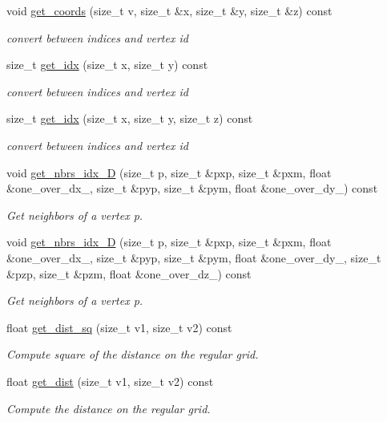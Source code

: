 \begin{DoxyCompactItemize}
void \hyperlink{struct_r_grid_a22875fbd6ba3068ec8ccd48b355e2183}{get\+\_\+coords} (size\+\_\+t v, size\+\_\+t \&x, size\+\_\+t \&y, size\+\_\+t \&z) const 
\begin{DoxyCompactList}\small\item\em convert between indices and vertex id \end{DoxyCompactList}\item 
size\+\_\+t \hyperlink{struct_r_grid_a906a0794df53258fd129707f5adb1a09}{get\+\_\+idx} (size\+\_\+t x, size\+\_\+t y) const 
\begin{DoxyCompactList}\small\item\em convert between indices and vertex id \end{DoxyCompactList}\item 
size\+\_\+t \hyperlink{struct_r_grid_a8ca551941c83ba37e549260a2f4d3a86}{get\+\_\+idx} (size\+\_\+t x, size\+\_\+t y, size\+\_\+t z) const 
\begin{DoxyCompactList}\small\item\em convert between indices and vertex id \end{DoxyCompactList}\item 
void \hyperlink{struct_r_grid_aaeedcdbb340eaf106a4792dec3a54d7d}{get\+\_\+nbrs\+\_\+idx\+\_\+D} (size\+\_\+t p, size\+\_\+t \&pxp, size\+\_\+t \&pxm, float \&one\+\_\+over\+\_\+dx\+\_\+, size\+\_\+t \&pyp, size\+\_\+t \&pym, float \&one\+\_\+over\+\_\+dy\+\_\+) const 
\begin{DoxyCompactList}\small\item\em Get neighbors of a vertex p. \end{DoxyCompactList}\item 
void \hyperlink{struct_r_grid_add4468ed71d4f02e7702bd90d9255f15}{get\+\_\+nbrs\+\_\+idx\+\_\+D} (size\+\_\+t p, size\+\_\+t \&pxp, size\+\_\+t \&pxm, float \&one\+\_\+over\+\_\+dx\+\_\+, size\+\_\+t \&pyp, size\+\_\+t \&pym, float \&one\+\_\+over\+\_\+dy\+\_\+, size\+\_\+t \&pzp, size\+\_\+t \&pzm, float \&one\+\_\+over\+\_\+dz\+\_\+) const 
\begin{DoxyCompactList}\small\item\em Get neighbors of a vertex p. \end{DoxyCompactList}\item 
float \hyperlink{struct_r_grid_a052d3f12e5da64fc5b945b7ec213da03}{get\+\_\+dist\+\_\+sq} (size\+\_\+t v1, size\+\_\+t v2) const 
\begin{DoxyCompactList}\small\item\em Compute square of the distance on the regular grid. \end{DoxyCompactList}\item 
float \hyperlink{struct_r_grid_afca6428602e31a08e8ef1b1b2dabfcbc}{get\+\_\+dist} (size\+\_\+t v1, size\+\_\+t v2) const 
\begin{DoxyCompactList}\small\item\em Compute the distance on the regular grid. \end{DoxyCompactList}\end{DoxyCompactItemize}

